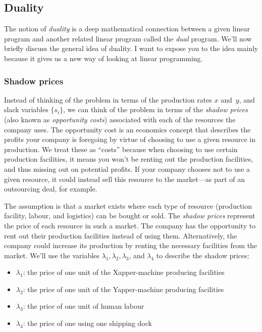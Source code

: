 \documentclass[11pt,oneside]{article}
\begin{document}
		
		
		
		
				
	\subsection{Duality}
	
		The notion of \emph{duality} is a deep mathematical connection between a given linear program 
		and another related linear program called the \emph{dual} program.
		We'll now briefly discuss the general idea of duality.
		I want to expose you to the idea mainly because it gives us a new way of looking at linear programming.
		
		\subsubsection{Shadow prices}
			
			Instead of thinking of the problem in terms of the production rates $x$ and~$y$,
			and slack variables $\{ s_i \}$, 
			we can think of the problem in terms of the \emph{shadow prices} (also known as \emph{opportunity costs}) 
			associated with each of the resources the company uses. 
			The opportunity cost is an economics concept that describes the profits your company is foregoing 
			by virtue of choosing to use a given resource in production.
			We treat these as ``costs'' because when choosing to use certain production facilities,
			it means you won't be renting out the production facilities, and thus missing out on potential profits.			
			If your company chooses not to use a given resource,
			it could instead sell this resource to the market---as part of an outsourcing deal, for example.

			The assumption is that a market exists where each type of resource (production facility, labour, and logistics) can be bought or sold.
			The \emph{shadow prices} represent the price of each resource in such a market.
			The company has the opportunity to rent out their production facilities instead of using them. 
			Alternatively, the company could increase its production by renting the necessary facilities from the market.
			We'll use the variables $\lambda_1, \lambda_2, \lambda_3$, and $\lambda_4$ to describe the shadow prices:
			
			\begin{itemize}
				\item $\lambda_1$: the price of one unit of the Xapper-machine producing facilities
				\item $\lambda_2$: the price of one unit of the Yapper-machine producing facilities
				\item $\lambda_3$: the price of one unit of human labour 
				\item $\lambda_4$: the price of one using one shipping dock 
			\end{itemize}
			
\end{document}
